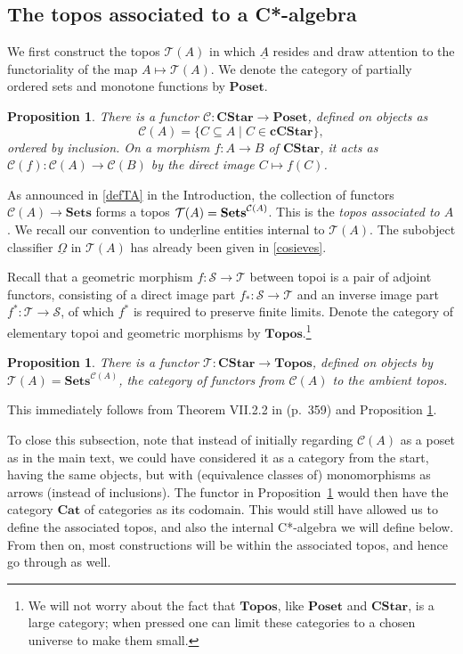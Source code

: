 \documentclass[11pt]{article}
\newcommand{\Sets}{\mbox{\textbf{Sets}}}
\newcommand{\er}{\eqref}
\newcommand{\CA}{{\mathcal A}} \newcommand{\CB}{{\mathcal B}}
\newcommand{\alg}[1]{\ensuremath{#1}}
\newcommand{\functor}[1]{\ensuremath{\underline{#1}}}
\newcommand{\Cat}[1]{\ensuremath{\mathrm{\textbf{#1}}}}
\newcommand{\Cstar}{\Cat{CStar}\xspace}
\newcommand{\Ccstar}{\Cat{cCStar}\xspace}
\newcommand{\Set}{\Cat{Sets}\xspace}
\newcommand{\context}{\ensuremath{\mathcal{C}}}
\newcommand{\asstopos}{\ensuremath{\mathcal{T}}}
\newcommand{\uA}{\underline{A}}
\renewcommand{\CA}{\mathcal{C}(A)}
\newcommand{\TA}{\mathcal{T}(A)}
\renewcommand{\TA}{\asstopos(\alg{A})}
\renewcommand{\CA}{\context(\alg{A})}
\newtheorem{proposition}[theorem]{Proposition}
\begin{document}
\subsection{The topos associated to a C*-algebra}
We first construct the topos $\TA$ in which $\uA$ resides and draw attention to
the functoriality of the map $A\mapsto \TA$.
We denote the category of partially ordered sets and monotone
functions  by $\Cat{Poset}$.

\begin{proposition}
\label{prop:contextfunctor}
  There is a functor $\context : \Cstar \to \Cat{Poset}$,  defined
  on objects as
  \[
    \CA = \{ \alg{C} \subseteq \alg{A} \mid
                           \alg{C} \in \Ccstar \},
  \]
  ordered by inclusion.
  On a morphism $f:\alg{A} \to \alg{B}$ of \Cstar,
  it acts as $\mathcal{C}(f) : \CA \to
  \mathcal{C}(\alg{B})$ by the direct image $\alg{C} \mapsto f(\alg{C})$.
\end{proposition}
As announced in \er{defTA} in the Introduction, the collection of
functors  $\CA \to \Set$ forms a topos
$\asstopos(\alg{A})=\Sets^{\CA}$. This is the \emph{topos associated
to $A$}. We recall our convention to  $\underline{\mathrm{underline}}$
entities internal to $\TA$. The subobject classifier $\functor{\Omega}$ in
$\asstopos(\alg{A})$ has already been given in \er{cosieves}.

Recall that a geometric morphism $f:\mathcal{S} \to \mathcal{T}$ between
topoi is a pair of adjoint functors, consisting of a direct image
part $f_*:\mathcal{S}\to\mathcal{T}$ and an inverse image part $f^*:\mathcal{T}
\to \mathcal{S}$, of which $f^*$ is required to preserve finite limits.
Denote the category of elementary topoi and geometric
morphisms  by \Cat{Topos}.\footnote{We will not worry about the fact that
\Cat{Topos}, like \Cat{Poset} and \Cstar, is a large category;
when pressed one can limit these categories to a chosen universe to
make them small.}
\begin{proposition}
\label{prop:asstopos}
  There is a functor $\asstopos : \Cstar \to \Cat{Topos}$, defined
  on objects by $\asstopos(\alg{A})=\Set^{\CA}$, the
  category of functors from $\CA$ to the ambient topos.
\end{proposition}
This immediately follows from Theorem VII.2.2 in
\cite{maclanemoerdijk92} (p.\ 359) and Proposition
\ref{prop:contextfunctor}.

To close this subsection, note that instead of
initially regarding $\CA$ as a
 poset as in the main text, we could have considered it as a category from the
start, having the same
objects, but with (equivalence classes of) monomorphisms as arrows (instead of
inclusions). The functor in
Proposition~\ref{prop:contextfunctor} would then have the category
$\Cat{Cat}$ of categories as its codomain. This would still have
allowed us to define the associated topos, and also the internal
C*-algebra we will define below. From then on, most
constructions will be within the associated topos, and hence go
through as well.
\end{document}
